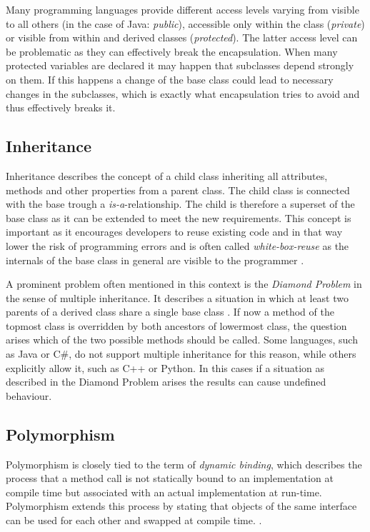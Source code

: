 Many programming languages provide different access levels varying from visible to all others (in the case of Java: \emph{public}), accessible only within the class (\emph{private}) or visible from within and derived classes (\emph{protected}). The latter access level can be problematic as they can effectively break the encapsulation. When many protected variables are declared it may happen that subclasses depend strongly on them. If this happens a change of the base class could lead to necessary changes in the subclasses, which is exactly what encapsulation tries to avoid and thus effectively breaks it\cite[p.19]{gof}.

\subsection{Inheritance}
Inheritance describes the concept of a child class inheriting all attributes, methods and other properties from a parent class. The child class is connected with the base trough a \emph{is-a}-relationship. The child is therefore a superset of the base class as it can be extended to meet the new requirements. This concept is important as it encourages developers to reuse existing code and in that way lower the risk of programming errors \cite{johnson91} and is often called \emph{white-box-reuse} as the internals of the base class in general are visible to the programmer \cite[p.19]{gof}. 

A prominent problem often mentioned in this context is the \emph{Diamond Problem} in the sense of multiple inheritance. It describes a situation in which at least two parents of a derived class share a single base class \cite{truyen04}. If now a method of the topmost class is overridden by both ancestors of lowermost class, the question arises which of the two possible methods should be called. Some languages, such as Java or C\#, do not support multiple inheritance for this reason, while others explicitly allow it, such as C++ or Python. In this cases if a situation as described in the Diamond Problem arises the results can cause undefined behaviour.

\subsection{Polymorphism}

Polymorphism is closely tied to the term of \emph{dynamic binding}, which describes the process that a method call is not statically bound to an implementation at compile time but associated with an actual implementation at run-time. Polymorphism extends this process by stating that objects of the same interface can be used for each other and swapped at compile time. \cite[p.14]{gof}. 

